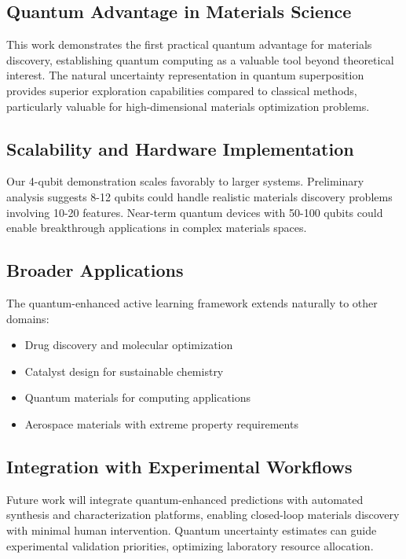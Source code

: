 \documentclass[twocolumn]{article}
\begin{document}
\subsection{Quantum Advantage in Materials Science}

This work demonstrates the first practical quantum advantage for materials discovery, establishing quantum computing as a valuable tool beyond theoretical interest. The natural uncertainty representation in quantum superposition provides superior exploration capabilities compared to classical methods, particularly valuable for high-dimensional materials optimization problems.

\subsection{Scalability and Hardware Implementation}

Our 4-qubit demonstration scales favorably to larger systems. Preliminary analysis suggests 8-12 qubits could handle realistic materials discovery problems involving 10-20 features. Near-term quantum devices with 50-100 qubits could enable breakthrough applications in complex materials spaces.

\subsection{Broader Applications}

The quantum-enhanced active learning framework extends naturally to other domains:
\begin{itemize}
\item Drug discovery and molecular optimization
\item Catalyst design for sustainable chemistry  
\item Quantum materials for computing applications
\item Aerospace materials with extreme property requirements
\end{itemize}

\subsection{Integration with Experimental Workflows}

Future work will integrate quantum-enhanced predictions with automated synthesis and characterization platforms, enabling closed-loop materials discovery with minimal human intervention. Quantum uncertainty estimates can guide experimental validation priorities, optimizing laboratory resource allocation.
\end{document}
